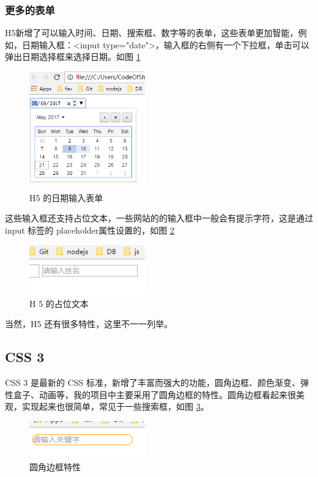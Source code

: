             \subsubsection{更多的表单}
              \label{subsubsec:更多的表单}
                H5新增了可以输入时间、日期、搜索框、数字等的表单，这些表单更加智能，例如，日期输入框：<input type="date">，输入框的右侧有一个下拉框，单击可以弹出日期选择框来选择日期。如图 \ref{fig:h5_date}
                \begin{figure}[H]
                  \centering
                  \includegraphics[width=5cm]{./img/h5_date.png}
                  \caption{H5 的日期输入表单}
                  \label{fig:h5_date}
                \end{figure}

                这些输入框还支持占位文本，一些网站的的输入框中一般会有提示字符，这是通过 input 标签的 placeholder属性设置的，如图 \ref{fig:h5_placeholder}
                \begin{figure}[H]
                  \centering
                  \includegraphics[width=5cm]{./img/h5_placeholder.png}
                  \caption{H 5 的占位文本}
                  \label{fig:h5_placeholder}
                \end{figure}
                当然，H5 还有很多特性，这里不一一列举。

        \subsection{CSS 3}
          \label{subsec:css_3}
            CSS 3 是最新的 CSS 标准，新增了丰富而强大的功能，圆角边框、颜色渐变、弹性盒子、动画等，我的项目中主要采用了圆角边框的特性。圆角边框看起来很美观，实现起来也很简单，常见于一些搜索框，如图 \ref{fig:h5_borderradius}。
            \begin{figure}[H]
              \centering
              \includegraphics[width=5cm]{./img/h5_borderradius.png}
              \caption{圆角边框特性}
              \label{fig:h5_borderradius}
            \end{figure}

